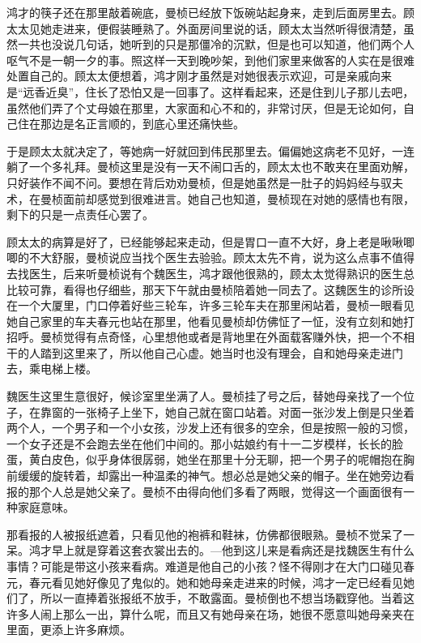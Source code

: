 \par 鸿才的筷子还在那里敲着碗底，曼桢已经放下饭碗站起身来，走到后面房里去。顾太太见她走进来，便假装睡熟了。外面房间里说的话，顾太太当然听得很清楚，虽然一共也没说几句话，她听到的只是那僵冷的沉默，但是也可以知道，他们两个人呕气不是一朝一夕的事。照这样一天到晚吵架，到他们家里来做客的人实在是很难处置自己的。顾太太便想着，鸿才刚才虽然是对她很表示欢迎，可是亲戚向来是“远香近臭”，住长了恐怕又是一回事了。这样看起来，还是住到儿子那儿去吧，虽然他们弄了个丈母娘在那里，大家面和心不和的，非常讨厌，但是无论如何，自己住在那边是名正言顺的，到底心里还痛快些。
\par 于是顾太太就决定了，等她病一好就回到伟民那里去。偏偏她这病老不见好，一连躺了一个多礼拜。曼桢这里是没有一天不闹口舌的，顾太太也不敢夹在里面劝解，只好装作不闻不问。要想在背后劝劝曼桢，但是她虽然是一肚子的妈妈经与驭夫术，在曼桢面前却感觉到很难进言。她自己也知道，曼桢现在对她的感情也有限，剩下的只是一点责任心罢了。
\par 顾太太的病算是好了，已经能够起来走动，但是胃口一直不大好，身上老是啾啾唧唧的不大舒服，曼桢说应当找个医生去验验。顾太太先不肯，说为这么点事不值得去找医生，后来听曼桢说有个魏医生，鸿才跟他很熟的，顾太太觉得熟识的医生总比较可靠，看得也仔细些，那天下午就由曼桢陪着她一同去了。这魏医生的诊所设在一个大厦里，门口停着好些三轮车，许多三轮车夫在那里闲站着，曼桢一眼看见她自己家里的车夫春元也站在那里，他看见曼桢却仿佛怔了一怔，没有立刻和她打招呼。曼桢觉得有点奇怪，心里想他或者是背地里在外面载客赚外快，把一个不相干的人踏到这里来了，所以他自己心虚。她当时也没有理会，自和她母亲走进门去，乘电梯上楼。
\par 魏医生这里生意很好，候诊室里坐满了人。曼桢挂了号之后，替她母亲找了一个位子，在靠窗的一张椅子上坐下，她自己就在窗口站着。对面一张沙发上倒是只坐着两个人，一个男子和一个小女孩，沙发上还有很多的空余，但是按照一般的习惯，一个女子还是不会跑去坐在他们中间的。那小姑娘约有十一二岁模样，长长的脸蛋，黄白皮色，似乎身体很孱弱，她坐在那里十分无聊，把一个男子的呢帽抱在胸前缓缓的旋转着，却露出一种温柔的神气。想必总是她父亲的帽子。坐在她旁边看报的那个人总是她父亲了。曼桢不由得向他们多看了两眼，觉得这一个画面很有一种家庭意味。
\par 那看报的人被报纸遮着，只看见他的袍裤和鞋袜，仿佛都很眼熟。曼桢不觉呆了一呆。鸿才早上就是穿着这套衣裳出去的。—他到这儿来是看病还是找魏医生有什么事情？可能是带这小孩来看病。难道是他自己的小孩？怪不得刚才在大门口碰见春元，春元看见她好像见了鬼似的。她和她母亲走进来的时候，鸿才一定已经看见她们了，所以一直捧着张报纸不放手，不敢露面。曼桢倒也不想当场戳穿他。当着这许多人闹上那么一出，算什么呢，而且又有她母亲在场，她很不愿意叫她母亲夹在里面，更添上许多麻烦。
